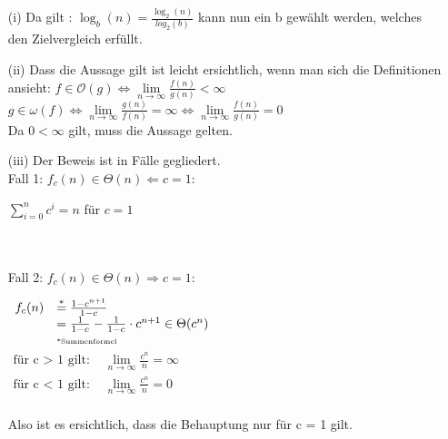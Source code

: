 \documentclass[a4paper,11pt,fleqn]{scrartcl}
\begin{document}
\begin{enumerate}
\begin{enumerate}
			\begin{enumerate}
				\item[(i)]
				Da gilt : $\log_b(n) = \frac{\log_2(n)}{log_2(b)}$ kann nun ein b gewählt werden, welches den Zielvergleich erfüllt.
				\item[(ii)]
				Dass die Aussage gilt ist leicht ersichtlich, wenn man sich die Definitionen ansieht:
				$f\in \mathcal{O}(g) \Leftrightarrow \lim\limits_{n\rightarrow\infty}\frac{f(n)}{g(n)}<\infty$ \\
				$g\in \omega(f) \Leftrightarrow \lim\limits_{n\rightarrow\infty}\frac{g(n)}{f(n)}=\infty
				\Leftrightarrow \lim\limits_{n\rightarrow\infty}\frac{f(n)}{g(n)} = 0$ \\
				Da $0 < \infty$ gilt, muss die Aussage gelten.
				\item[(iii)]
				Der Beweis ist in Fälle gegliedert. \\
				Fall 1: $f_c(n)\in\Theta(n)\Leftarrow c = 1:$ \\
				\begin{center}
					$\sum\limits_{i=0}^n c^i = n$ für $c = 1$ 
				\end{center}
				\quad \\ \\
				Fall 2: $f_c(n)\in\Theta(n)\Rightarrow c = 1:$ \\
				\begin{center}
					\(				
					\begin{array}{rl}
						f_c(n) &\overset{*}{=} \frac{1-c^{n+1}}{1-c} \\
						& = \frac{1}{1-c} - \frac{1}{1-c} \cdot c^{n+1} \in\Theta (c^n)\\
						& \text{\tiny{*Summenformel}}
					\end{array}
					\) \\ \(
					\begin{array}{rl}
						\text{für c > 1 gilt: } & \lim\limits_{n\rightarrow\infty}\frac{c^n}{n} = \infty \\
						\text{für c < 1 gilt: } & \lim\limits_{n\rightarrow\infty}\frac{c^n}{n} = 0 \\
					\end{array}
					\) \\
				\end{center}
				Also ist es ersichtlich, dass die Behauptung nur für c = 1 gilt. \\ \\
			\end{enumerate}
		\end{enumerate}
		

\end{enumerate}
\end{document}
